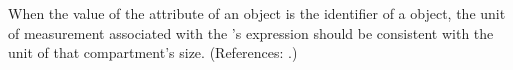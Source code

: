 When the value of the attribute  of an \EventAssignment
object is the identifier of a \Compartment object, the unit of measurement
associated with the \EventAssignment's  expression should be
consistent with the unit of that compartment's size.  (References: .)
